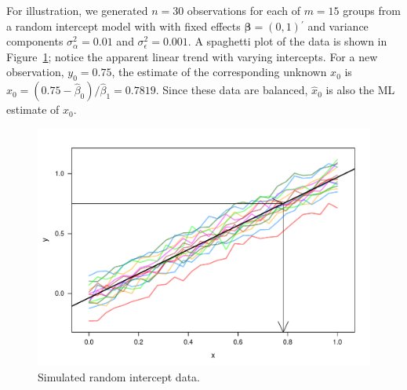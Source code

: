 \documentclass[cmfont,usenames,dvipsnames,leqno]{afit-etd}\usepackage[]{graphicx}\usepackage[]{color}
\makeatletter
\def\maxwidth{ %
  \ifdim\Gin@nat@width>\linewidth
    \linewidth
  \else
    \Gin@nat@width
  \fi
}
\newenvironment{knitrout}{}{} %
\renewenvironment{knitrout}{\begin{singlespace}}{\end{singlespace}}
\newcommand{\trans}{\ensuremath{^\prime}}
\newcommand{\wh}[1]{\ensuremath{\widehat{#1}}}
\makeatother
\begin{document}
For illustration, we generated $n = 30$ observations for each of $m = 15$ groups from a random intercept model with with fixed effects $\bm{\beta} = \left(0, 1\right)\trans$ and variance components $\sigma_\alpha^2 = 0.01$ and $\sigma_\epsilon^2 = 0.001$. A spaghetti plot of the data is shown in Figure~\ref{fig:simdata-scatter}; notice the apparent linear trend with varying intercepts. For a new observation, $y_0 = 0.75$, the estimate of the corresponding unknown $x_0$ is $\wh{x}_0 = \left(0.75 - \wh{\beta}_0\right)/\wh{\beta}_1 = 0.7819$. Since these data are balanced, $\wh{x}_0$ is also the \ac{ML} estimate of $x_0$. 

\begin{knitrout}
\color{fgcolor}\begin{figure}[H]

\includegraphics[width=\maxwidth]{figure/simdata-scatter} \caption[Scatterplot of simulated random intercept data]{Simulated random intercept data.\label{fig:simdata-scatter}}
\end{figure}


\end{knitrout}
\end{document}
